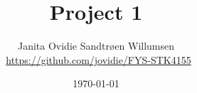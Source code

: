 \documentclass[reprint,english,notitlepage]{revtex4-1}  %
\begin{document}

% 


% 
\title{Project 1}
\author{Janita Ovidie Sandtrøen Willumsen \\ \faGithub \, \url{https://github.com/jovidie/FYS-STK4155}}        
\date{\today}
\noaffiliation


\maketitle

% 
% 
% 
% 
% 
% 
% 
% 
% 
\newpage
% 

 
\onecolumngrid
\newpage 


\newpage



\end{document}
